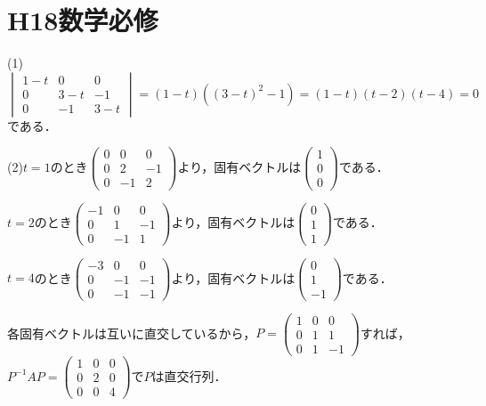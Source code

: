 \documentclass[
		book,
		head_space=20mm,
		foot_space=20mm,
		gutter=10mm,
		line_length=190mm
]{jlreq}
\begin{document}
\section{H18数学必修}
(1)$\begin{vmatrix}
    1-t & 0 & 0\\
    0 & 3-t & -1 \\
    0 & -1 & 3-t
\end{vmatrix}=(1-t)((3-t)^2-1)=(1-t)(t-2)(t-4)=0$である．

(2)$t=1$のとき$\begin{pmatrix}
    0 & 0 & 0\\
    0 & 2 & -1\\
    0 & -1 & 2
    \end{pmatrix}$より，固有ベクトルは$\begin{pmatrix}
    1\\
    0\\
    0
    \end{pmatrix}$である．

$t=2$のとき$\begin{pmatrix}
    -1 & 0 & 0\\
    0 & 1 & -1\\
    0 & -1 & 1
    \end{pmatrix}$より，固有ベクトルは$\begin{pmatrix}
    0\\
    1\\
    1
    \end{pmatrix}$である．

$t=4$のとき$\begin{pmatrix}
    -3 & 0 & 0\\
    0 & -1 & -1\\
    0 & -1 & -1
    \end{pmatrix}$より，固有ベクトルは$\begin{pmatrix}
    0\\
    1\\
    -1
    \end{pmatrix}$である．

    各固有ベクトルは互いに直交しているから，$P=\begin{pmatrix}
    1 & 0 & 0\\
    0 & 1 & 1\\
    0 & 1 & -1
    \end{pmatrix}$すれば，$P^{-1}AP=\begin{pmatrix}
    1 & 0 & 0\\
    0 & 2 & 0\\
    0 & 0 & 4
    \end{pmatrix}$で$P$は直交行列．
\end{document}
